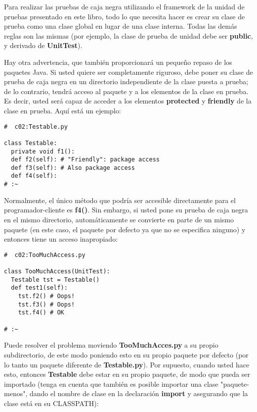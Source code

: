 Para realizar las pruebas de caja negra utilizando el framework de la unidad de pruebas presentado en este libro, todo lo que necesita hacer es crear su clase de prueba como una clase global en lugar de una clase interna. Todas las demás reglas son las mismas (por ejemplo, la clase de prueba de unidad debe ser \textbf{public}, y derivado de \textbf{UnitTest}).     \newline

Hay otra advertencia, que también proporcionará un pequeño repaso de los paquetes Java. Si usted quiere ser completamente riguroso, debe poner su clase de prueba de caja negra en un directorio independiente de la clase puesta a prueba; de lo contrario, tendrá acceso al paquete y a los elementos de la clase en prueba. Es decir, usted será capaz de acceder a los elementos \textbf{protected} y \textbf{friendly} de la clase en prueba. Aquí está un ejemplo: \newline

\begin{lstlisting}
#  c02:Testable.py 

class Testable: 
  private void f1(): 
  def f2(self): # "Friendly": package access 
  def f3(self): # Also package access 
  def f4(self): 
# :~ 
\end{lstlisting}

Normalmente, el único método que podría ser accesible directamente para el programador-cliente es \textbf{f4()}. Sin embargo, si usted pone su prueba de caja negra en el mismo directorio, automáticamente se convierte en parte de un mismo paquete (en este caso, el paquete por defecto ya que no se especifica ninguno) y entonces tiene un acceso inapropiado:  \newline 

\begin{lstlisting}
#  c02:TooMuchAccess.py 

class TooMuchAccess(UnitTest): 
  Testable tst = Testable() 
  def test1(self): 
    tst.f2() # Oops! 
    tst.f3() # Oops! 
    tst.f4() # OK 
    
# :~ 
\end{lstlisting}

Puede resolver el problema moviendo \textbf{TooMuchAcces.py} a su propio subdirectorio, de este modo poniendo esto en su propio paquete por defecto (por lo tanto un paquete diferente de \textbf{Testable.py}). Por supuesto, cuando usted hace esto, entonces \textbf{Testable} debe estar en su propio paquete, de modo que pueda ser importado (tenga en cuenta que también es posible importar una clase "paquete-menos", dando el nombre de clase en la declaración \textbf{import} y asegurando que la clase está en su CLASSPATH):     \newline

